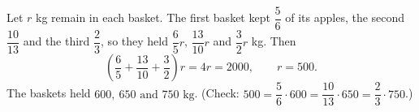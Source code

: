 Let $r$ kg remain in each basket. The first basket kept $\dfrac{5}{6}$ of its apples, the second $\dfrac{10}{13}$ and the third $\dfrac{2}{3}$, so they held $\dfrac{6}{5}r$, $\dfrac{13}{10}r$ and $\dfrac{3}{2}r$ kg. Then
\[
\left(\dfrac{6}{5}+\dfrac{13}{10}+\dfrac{3}{2}\right)r=4r=2000,\qquad r=500 .
\]
The baskets held $\boxed{600,\ 650\text{ and }750\text{ kg}}$. (Check: $500=\dfrac{5}{6}\cdot600=\dfrac{10}{13}\cdot650=\dfrac{2}{3}\cdot750$.)
